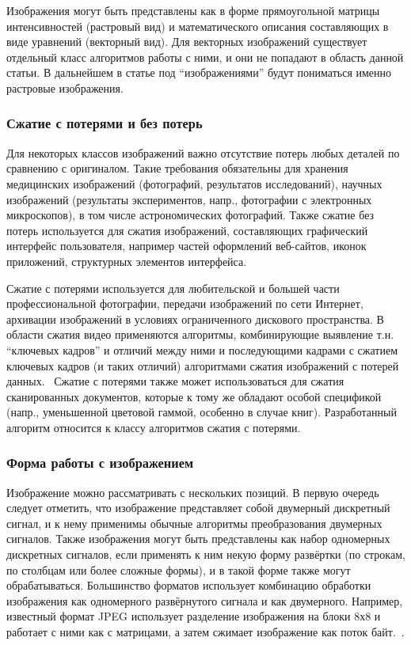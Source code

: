 \documentclass[a4paper,12pt]{article}
\numberwithin{equation}{section}
\begin{document}
Изображения могут быть представлены как в форме прямоугольной матрицы
интенсивностей (растровый вид) и математического описания составляющих в виде
уравнений (векторный вид). Для векторных изображений существует отдельный класс
алгоритмов работы с ними, и они не попадают в область данной статьи. В
дальнейшем в статье под ``изображениями'' будут пониматься именно растровые изображения.

\subsubsection{Сжатие с потерями и без потерь}

Для некоторых классов изображений важно отсутствие потерь любых деталей по
сравнению с оригиналом. Такие требования обязательны для хранения медицинских
изображений (фотографий, результатов исследований), научных изображений
(результаты экспериментов, напр., фотографии с электронных микроскопов), в том
числе астрономических фотографий. Также сжатие без потерь используется для
сжатия изображений, составляющих графический интерфейс пользователя, например
частей оформлений веб-сайтов, иконок приложений, структурных элементов интерфейса.

Сжатие с потерями используется для любительской и большей части профессиональной
фотографии, передачи изображений по сети Интернет, архивации изображений в
условиях ограниченного дискового пространства. В области сжатия видео
применяются алгоритмы, комбинирующие выявление т.н. ``ключевых кадров'' и
отличий между ними и последующими кадрами с сжатием ключевых кадров (и таких
отличий) алгоритмами сжатия изображений с потерей данных.~\cite{wiki:mpeg}
Сжатие с потерями также может использоваться для сжатия сканированных
документов, которые к тому же обладают особой спецификой (напр., уменьшенной
цветовой гаммой, особенно в случае книг). Разработанный алгоритм относится к
классу алгоритмов сжатия с потерями.

\subsubsection{Форма работы с изображением}

Изображение можно рассматривать с нескольких позиций. В первую очередь следует
отметить, что изображение представляет собой двумерный дискретный сигнал, и к
нему применимы обычные алгоритмы преобразования двумерных сигналов. Также
изображения могут быть представлены как набор одномерных дискретных сигналов,
если применять к ним некую форму развёртки (по строкам, по столбцам или более
сложные формы), и в такой форме также могут обрабатываться. Большинство форматов
использует комбинацию обработки изображения как одномерного развёрнутого сигнала
и как двумерного. Например, известный формат JPEG использует разделение
изображения на блоки 8х8 и работает с ними как с матрицами, а затем сжимает
изображение как поток байт.~\cite{jpeg}.
\end{document}
